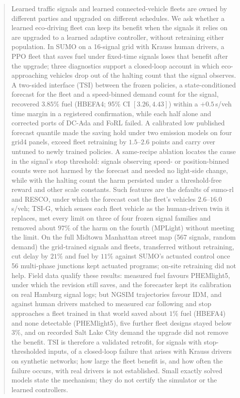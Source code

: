 \begin{abstract}
Learned traffic signals and learned connected-vehicle fleets are owned by different parties and upgraded on different schedules. We ask
whether a learned eco-driving fleet can keep its benefit when the signals it relies on are upgraded to a learned adaptive controller,
without retraining either population. In SUMO on a 16-signal grid with Krauss human drivers, a PPO fleet that saves fuel under fixed-time
signals loses that benefit after the upgrade; three diagnostics support a closed-loop account in which eco-approaching vehicles drop out of
the halting count that the signal observes. A two-sided interface (TSI) between the frozen policies, a state-conditioned forecast for the
fleet and a speed-binned demand count for the signal, recovered $3.85\%$ fuel (HBEFA4; 95\% CI $[3.26, 4.43]$) within a $+0.5$\,s/veh time
margin in a registered confirmation, while each half alone and corrected ports of DC-Ada and FoRL failed. A calibrated low published
forecast quantile made the saving hold under two emission models on four grid4 panels, exceed fleet retraining by $1.5$--$2.6$ points and
carry over untuned to newly trained policies. A same-recipe ablation locates the cause in the signal's stop threshold: signals observing
speed- or position-binned counts were not harmed by the forecast and needed no light-side change, while with the halting count the harm
persisted under a threshold-free reward and other scale constants. Such features are the defaults of sumo-rl and RESCO, under which the
forecast cost the fleet's vehicles $2.6$--$16.0$\,s/veh; TSI-G, which senses each fleet vehicle as the human-driven twin it replaces, met
every limit on three of four frozen signal families and removed about $97\%$ of the harm on the fourth (MPLight) without meeting the limit.
On the full Midtown Manhattan street map (567 signals, random demand) the grid-trained signals and fleets, transferred without retraining,
cut delay by $21\%$ and fuel by $11\%$ against SUMO's actuated control once 56 multi-phase junctions kept actuated programs; on-site
retraining did not help. Field data qualify these results: measured fuel favours PHEMlight5, under which the revision still saves, and the
forecaster kept its calibration on real Hamburg signal logs; but NGSIM trajectories favour IDM, and against human drivers matched to
measured car following and stop approaches a fleet trained in that world saved about $1\%$ fuel (HBEFA4) and none detectable
(PHEMlight5), five further fleet designs stayed below $3\%$, and on recorded Salt Lake City demand the upgrade did not remove the benefit.
TSI is therefore a validated retrofit, for signals with stop-thresholded inputs, of a closed-loop failure that arises with Krauss drivers
on synthetic networks; how large the fleet benefit is, and how often the failure occurs, with real drivers is not established. Small
exactly solved models state the mechanism; they do not certify the simulator or the learned controllers.
\end{abstract}

